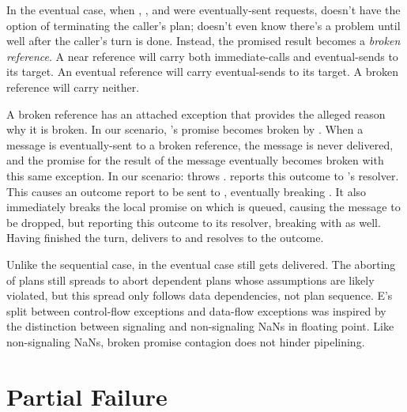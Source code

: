 \documentclass{llncs}
\begin{document}
In the eventual case, when , , and 
were eventually-sent requests,  doesn't have the option of
terminating the caller's plan;  doesn't even know there's a
problem until well after the caller's turn is done. Instead, the
promised result becomes a \emph{broken reference}. A near
reference will carry both immediate-calls and eventual-sends to its
target. An eventual reference will carry eventual-sends to its
target. A broken reference will carry neither.

A broken reference has an attached exception that provides the alleged
reason why it is broken. In our scenario, 's promise becomes
broken by . When a message is eventually-sent to a broken
reference, the message is never delivered, and the promise for the
result of the message eventually becomes broken with this same
exception. In our scenario:  throws .  reports
this outcome to 's resolver. This causes an outcome report to
be sent to , eventually breaking . 
%
%
It also immediately breaks the local promise on which  is
queued, causing the  message to be dropped, but reporting
this outcome to its resolver, breaking  with  as
well. 
%
%
Having finished the  turn,  delivers  to
 and resolves  to the outcome.

Unlike the sequential case, in the eventual case  still gets
delivered. The aborting of plans still spreads to abort dependent
plans whose assumptions are likely violated, but this spread only
follows data dependencies, not plan sequence. E's split between
control-flow exceptions and data-flow exceptions was inspired by the
distinction between signaling and non-signaling NaNs in floating
point. Like non-signaling NaNs, broken promise contagion does not
hinder pipelining.

\section{Partial Failure}
\end{document}
